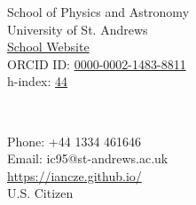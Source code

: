 \parbox[t]{3in}{
\begin{flushleft}
School of Physics and Astronomy\\
University of St. Andrews\\
\href{https://www.st-andrews.ac.uk/physics-astronomy/people/ic95/}{School Website} \\
ORCID ID: \href{http://orcid.org/0000-0002-1483-8811}{0000-0002-1483-8811} \\
h-index: \href{https://ui.adsabs.harvard.edu/public-libraries/G0Ow9TGTRyuVT7hbhzailA}{44} \\
\end{flushleft}} \ \hfill  \
\parbox[t]{3in}{
\begin{flushright}
Phone: +44 1334 461646\\
Email: ic95@st-andrews.ac.uk\\
\url{https://iancze.github.io/}\\
U.S. Citizen
\end{flushright}}
